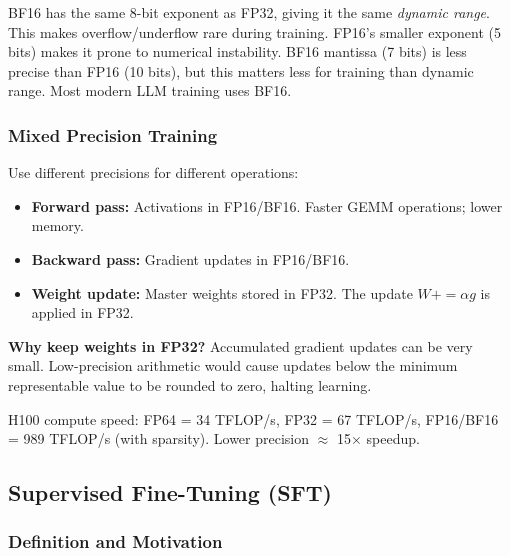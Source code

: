 \documentclass[11pt, a4paper]{article}
\begin{document}
\begin{notebox}
BF16 has the same 8-bit exponent as FP32, giving it the same \emph{dynamic range}. This makes overflow/underflow rare during training. FP16's smaller exponent (5 bits) makes it prone to numerical instability. BF16 mantissa (7 bits) is less precise than FP16 (10 bits), but this matters less for training than dynamic range. Most modern LLM training uses BF16.
\end{notebox}

\subsubsection{Mixed Precision Training}

\begin{defbox}
Use different precisions for different operations:
\begin{itemize}[leftmargin=1.5em]
  \item \textbf{Forward pass:} Activations in FP16/BF16. Faster GEMM operations; lower memory.
  \item \textbf{Backward pass:} Gradient updates in FP16/BF16.
  \item \textbf{Weight update:} Master weights stored in FP32. The update $W \mathrel{{+}{=}} \alpha g$ is applied in FP32.
\end{itemize}
\textbf{Why keep weights in FP32?} Accumulated gradient updates can be very small. Low-precision arithmetic would cause updates below the minimum representable value to be rounded to zero, halting learning.
\end{defbox}

H100 compute speed: FP64 = 34 TFLOP/s, FP32 = 67 TFLOP/s, FP16/BF16 = 989 TFLOP/s (with sparsity). Lower precision $\approx$ 15$\times$ speedup.

\subsection{Supervised Fine-Tuning (SFT)}

\subsubsection{Definition and Motivation}
\end{document}
